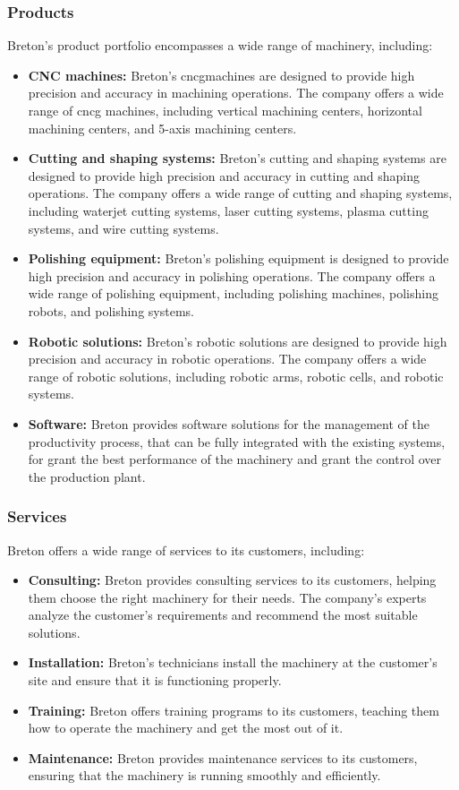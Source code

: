 \subsubsection{Products}
Breton's product portfolio encompasses a wide range of machinery, including:
\begin{itemize}
    \item \textbf{CNC machines:} Breton's \gls{cncg}\glsfirstoccur machines are designed to provide high precision and accuracy in machining operations. The company offers a wide range of \gls{cncg} machines, including vertical machining centers, horizontal machining centers, and 5-axis machining centers.
    \item \textbf{Cutting and shaping systems:} Breton's cutting and shaping systems are designed to provide high precision and accuracy in cutting and shaping operations. The company offers a wide range of cutting and shaping systems, including waterjet cutting systems, laser cutting systems, plasma cutting systems, and wire cutting systems.
    \item \textbf{Polishing equipment:} Breton's polishing equipment is designed to provide high precision and accuracy in polishing operations. The company offers a wide range of polishing equipment, including polishing machines, polishing robots, and polishing systems.
    \item \textbf{Robotic solutions:} Breton's robotic solutions are designed to provide high precision and accuracy in robotic operations. The company offers a wide range of robotic solutions, including robotic arms, robotic cells, and robotic systems.
    \item \textbf{Software:} Breton provides software solutions for the management of the productivity process, that can be fully integrated with the existing systems, for grant the best performance of the machinery and grant the control over the production plant.
\end{itemize} 
\subsubsection{Services}
Breton offers a wide range of services to its customers, including:
\begin{itemize}
    \item \textbf{Consulting:} Breton provides consulting services to its customers, helping them choose the right machinery for their needs. The company's experts analyze the customer's requirements and recommend the most suitable solutions.
    \item \textbf{Installation:} Breton's technicians install the machinery at the customer's site and ensure that it is functioning properly.
    \item \textbf{Training:} Breton offers training programs to its customers, teaching them how to operate the machinery and get the most out of it.
    \item \textbf{Maintenance:} Breton provides maintenance services to its customers, ensuring that the machinery is running smoothly and efficiently.
\end{itemize}
